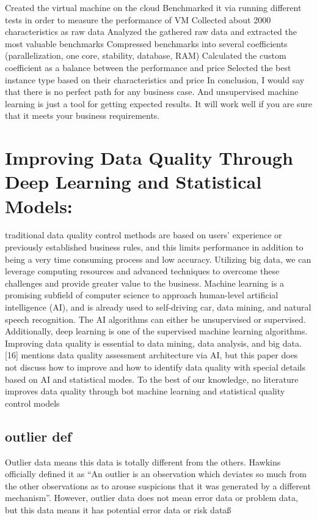 \documentclass{article}
\begin{document}
Created the virtual machine on the cloud
Benchmarked it via running different tests in order to measure the performance of VM
Collected about 2000 characteristics as raw data
Analyzed the gathered raw data and extracted the most valuable benchmarks
Compressed benchmarks into several coefficients (parallelization, one core, stability, database, RAM)
Calculated the custom coefficient as a balance between the performance and price
Selected the best instance type based on their characteristics and price
In conclusion, I would say that there is no perfect path for any business case. And unsupervised machine learning is just a tool for getting expected results. It will work well if you are sure that it meets your business requirements.
\section{Improving Data Quality Through Deep Learning and Statistical Models:}
traditional data quality control
methods are based on users’ experience or
previously established business rules, and this
limits performance in addition to being a very
time consuming process and low accuracy.
Utilizing big data, we can leverage computing
resources and advanced techniques to overcome
these challenges and provide greater value to the
business.
Machine learning is a promising subfield of
computer science to approach human-level
artificial intelligence (AI), and is already used to
self-driving car, data mining, and natural speech
recognition.
The AI algorithms can either
be unsupervised or supervised. Additionally,
deep learning is one of the supervised machine
learning algorithms.
Improving data quality
is essential to data mining, data analysis, and big
data. [16] mentions data quality assessment
architecture via AI, but this paper does not
discuss how to improve and how to identify data
quality with special details based on AI and
statistical modes.
To the best of our knowledge,
no literature improves data quality through bot
machine learning and statistical quality control
models
\subsection{outlier def}
Outlier data means this data is totally
different from the others. Hawkins officially
defined it as “An outlier is an observation which
deviates so much from the other observations as
to arouse suspicions that it was generated by a
different mechanism”.
However, outlier data
does not mean error data or problem data, but
this data means it has potential error data or risk
dataß
\end{document}
